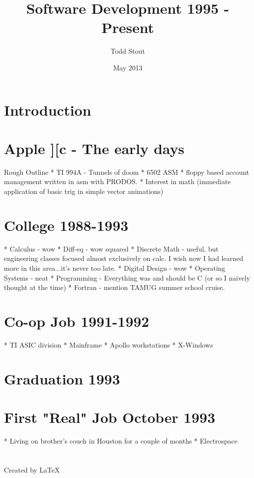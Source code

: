 \documentclass[12pt]{article}
\title{Software Development 1995 - Present}
\author{Todd Stout}
\date{May 2013}
\begin{document}
 \maketitle
\section{Introduction}

\pagebreak

\section{Apple ][c - The early days}
	Rough Outline
	* TI 994A - Tunnels of doom
	* 6502 ASM
	* floppy based account management written in asm with PRODOS.
	* Interest in math (immediate application of basic trig in simple vector animations)
	
\section{College 1988-1993}
	* Calculus - wow
	* Diff-eq - wow squared
	* Discrete Math - useful, but engineering classes focused almost exclusively on calc. I wish now I had 
	 learned more in this area...it's never too late.
	* Digital Design - wow
	* Operating Systems - neat
	* Programming - Everything was and should be C (or so I naively thought at the time)
	* Fortran - mention TAMUG summer school cruise.
\section{Co-op Job 1991-1992}
	* TI ASIC division
	* Mainframe
	* Apollo workstations
	* X-Windows
	
\section{Graduation 1993}
	
\section{First "Real" Job October 1993}
	* Living on brother's couch in Houston for a couple of months
	* Electrospace
\section{}

Created by \LaTeX\	
\end{document}
